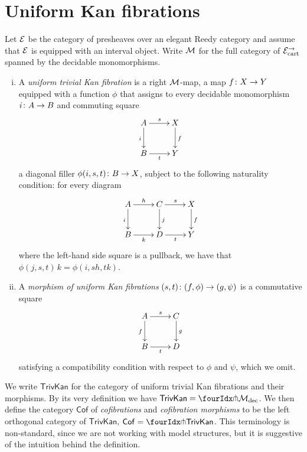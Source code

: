 \documentclass[reqno,10pt,a4paper,oneside]{amsart}
\begin{document}
\section{Uniform Kan fibrations}
\label{sec:uniform-kan-fibrations}

 
Let $\cal{E}$ be the category of presheaves over an elegant Reedy category and assume that $\cal{E}$
is equipped with an interval object. Write $\cal{M}$ for the full category of $\cal{E}^\to_\cart$ spanned
by the decidable monomorphisms. 

\begin{definition} \hfill
\begin{enumerate}[(i)]
\item A \emph{uniform trivial Kan fibration} is a right $\cal{M}$-map, \ie a map
$f  \co X \to Y$ equipped with a function $\phi$
that assigns to every decidable monomorphism $i \co A \to B$ and commuting square 
 \[
 \xymatrix{
 A \ar[r]^s \ar[d]_i & X \ar[d]^f \\
 B \ar[r]_t & Y}
 \]
a diagonal filler $\phi(i, s, t) \co B \to X$, subject to the following naturality condition: for every 
diagram 
\[
\xymatrix{
A \ar[r]^{h} \ar[d]_{i} & C \ar[d]^{j}  \ar[r]^s & X \ar[d]^f \\
B \ar[r]_{k} & D \ar[r]_t & Y }
\]
where the left-hand side square is a pullback, we have that $\phi(j, s, t) \, k = \phi(i, s  h, t  k)$.
 \item A \emph{morphism of uniform Kan fibrations} $(s, t) \co (f, \phi) \to (g, \psi)$ is a commutative
 square
 \[
 \xymatrix{
  A \ar[d]_f \ar[r]^s & C \ar[d]^g \\
  B \ar[r]_{t}& D} 
  \]
  satisfying a compatibility condition with respect to $\phi$ and $\psi$, which we omit. 
\end{enumerate}
\end{definition}

We write $\mathsf{TrivKan}$ for the category of uniform trivial Kan fibrations and their morphisms.
By its very definition we have $\mathsf{TrivKan} = \liftr{\cal{M}_{\textup{dec}}}$. We then define
the category $\mathsf{Cof}$ of \emph{cofibrations} and \emph{cofibration morphisms} to be the left orthogonal
category of $\mathsf{TrivKan}$, \ie $\mathsf{Cof} = \liftl{\mathsf{TrivKan}}$. This terminology is non-standard,
since we are not working with model structures, but it is suggestive of the intuition behind the definition.
\end{document}
